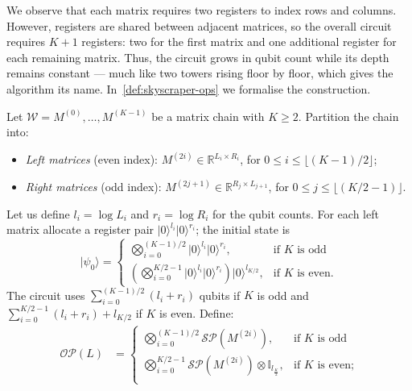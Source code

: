 \documentclass[a4paper,UKenglish,cleveref,autoref,thm-restate]{socg-lipics-v2021}
\providecommand{\ket}[1]{\lvert #1 \rangle}
\newcommand{\SP}{\mathcal{SP}}        %
\newcommand{\OP}{\mathcal{OP}}        %
\newcommand{\Id}{\mathbb{I}}         %
\begin{document}
We observe that each matrix requires two registers to index rows and columns. However, registers are shared between adjacent matrices, so the overall circuit requires $K+1$  registers: two for the first matrix and one additional register for each remaining matrix.
Thus, the circuit grows in qubit count while its depth remains constant --- much like two towers rising floor by floor, which gives the algorithm its name. In~\cref{def:skyscraper-ops} we formalise the construction.

\begin{definition}\label{def:skyscraper-ops}
  Let $\mathcal{W} = M^{(0)}, \ldots, M^{(K-1)}$ be a matrix chain with $K \ge 2$.
Partition the chain into:
  \begin{itemize}
    \item \emph{Left matrices} (even index):
          $M^{(2i)} \in \mathbb{R}^{L_i \times R_i}$, for
          $0 \leq i \leq \lfloor(K-1)/2\rfloor$;
    \item \emph{Right matrices} (odd index):
          $M^{(2j+1)} \in \mathbb{R}^{R_j \times L_{j+1}}$, for
          $0 \leq j \leq \lfloor(K/2 - 1)\rfloor$.
  \end{itemize}
  Let us define $l_i = \log L_i$ and $r_i = \log R_i$ for the qubit counts.
  For each left matrix allocate a register pair
  $\ket{0}^{l_i}\ket{0}^{r_i}$; the initial state is
  \begin{equation*}\label{eq:psi0}
    \ket{\psi_0}
    = \left\{\begin{array}{ll}
    \bigotimes_{i=0}^{(K-1)/2} \ket{0}^{l_i}\ket{0}^{r_i}, & \mbox{if $K$ is odd}\\
    \left(\bigotimes_{i=0}^{K/2-1} \ket{0}^{l_i}\ket{0}^{r_i}\right) \ket{0}^{l_{K/2}}, & \mbox{if $K$ is even.}
    \end{array}
    \right.
\end{equation*}
  The circuit uses $\sum_{i=0}^{(K-1)/2}(l_i + r_i)$ qubits if $K$ is odd and $\sum_{i=0}^{K/2-1}(l_i + r_i) + l_{K/2}$ if $K$ is even.
  Define:
  \begin{align}
    \OP(L) &= \left\{\begin{array}{ll}
    \bigotimes_{i=0}^{(K-1)/2} \SP\!\left(M^{(2i)}\right),& \mbox{if $K$ is odd}\\
    \bigotimes_{i=0}^{K/2-1} \SP\!\left(M^{(2i)}\right) \otimes \Id_{l_\frac{K}{2}}, & \mbox{if $K$ is even;}\\
    \end{array}
    \right.
    \label{eq:OPL}\\[4pt]

\end{align}
\end{definition}
\end{document}
